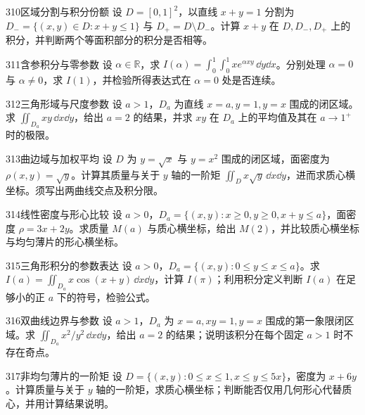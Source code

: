 \begin{exercise}{310}{区域分割与积分份额}
设 $D=[0,1]^2$，以直线 $x+y=1$ 分割为 $D_-=\{(x,y)\in D:x+y\leq1\}$ 与 $D_+=D\setminus D_-$。计算 $x+y$ 在 $D,D_-,D_+$ 上的积分，并判断两个等面积部分的积分是否相等。
\end{exercise}

\begin{exercise}{311}{含参积分与零参数}
设 $\alpha\in\mathbb R$，求 $I(\alpha)=\int_0^1\int_0^1xe^{\alpha xy}\,\dd y\dd x$。分别处理 $\alpha=0$ 与 $\alpha\ne0$，求 $I(1)$，并检验所得表达式在 $\alpha=0$ 处是否连续。
\end{exercise}

\begin{exercise}{312}{三角形域与尺度参数}
设 $a>1$，$D_a$ 为直线 $x=a,y=1,y=x$ 围成的闭区域。求 $\iint_{D_a}xy\,\dd x\dd y$，给出 $a=2$ 的结果，并求 $xy$ 在 $D_a$ 上的平均值及其在 $a\to1^+$ 时的极限。
\end{exercise}

\begin{exercise}{313}{曲边域与加权平均}
设 $D$ 为 $y=\sqrt{x}$ 与 $y=x^2$ 围成的闭区域，面密度为 $\rho(x,y)=\sqrt y$。计算其质量与关于 $y$ 轴的一阶矩 $\iint_Dx\sqrt y\,\dd x\dd y$，进而求质心横坐标。须写出两曲线交点及积分限。
\end{exercise}

\begin{exercise}{314}{线性密度与形心比较}
设 $a>0$，$D_a=\{(x,y):x\geq0,y\geq0,x+y\leq a\}$，面密度 $\rho=3x+2y$。求质量 $M(a)$ 与质心横坐标，给出 $M(2)$，并比较质心横坐标与均匀薄片的形心横坐标。
\end{exercise}

\begin{exercise}{315}{三角形积分的参数表达}
设 $a>0$，$D_a=\{(x,y):0\leq y\leq x\leq a\}$。求 $I(a)=\iint_{D_a}x\cos(x+y)\,\dd x\dd y$，计算 $I(\pi)$；利用积分定义判断 $I(a)$ 在足够小的正 $a$ 下的符号，检验公式。
\end{exercise}

\begin{exercise}{316}{双曲线边界与参数}
设 $a>1$，$D_a$ 为 $x=a,xy=1,y=x$ 围成的第一象限闭区域。求 $\iint_{D_a}x^2/y^2\,\dd x\dd y$，给出 $a=2$ 的结果；说明该积分在每个固定 $a>1$ 时不存在奇点。
\end{exercise}

\begin{exercise}{317}{非均匀薄片的一阶矩}
设 $D=\{(x,y):0\leq x\leq1,x\leq y\leq5x\}$，密度为 $x+6y$。计算质量与关于 $y$ 轴的一阶矩，求质心横坐标；判断能否仅用几何形心代替质心，并用计算结果说明。
\end{exercise}

